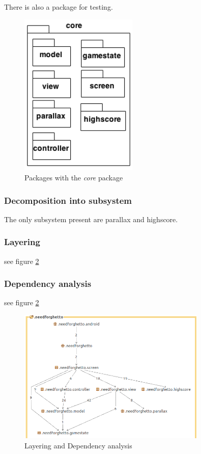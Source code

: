 \documentclass{article}
\begin{document}
There is also a package for testing.

  \begin{figure}[h]
  \centering
  \includegraphics[width=0.5\textwidth]{core.png}
  \caption{Packages with the \textit{core} package}
  \label{fig:core}
  \end{figure}


\subsubsection{Decomposition into subsystem}
The only subsystem present are parallax and highscore.

\subsubsection{Layering}
see figure \ref{fig:stan}

\subsubsection{Dependency analysis}
see figure \ref{fig:stan}


\begin{figure}[h]
  \centering
  \includegraphics[width=0.8\textwidth]{stan.png}
  \caption{Layering and Dependency analysis}
  \label{fig:stan}
\end{figure}
\end{document}
